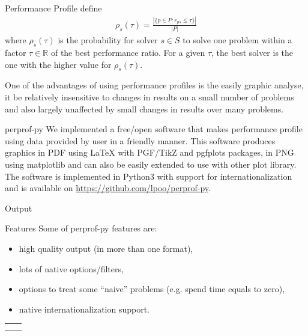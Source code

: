 \documentclass[a0paper,portrait]{baposter}
\begin{document}
\begin{poster}
\begin{posterbox}[column=0,below=auto]{Performance Profile}
    \citeauthor{Dolan2001} define
    \begin{align*}
      \rho_s(\tau) = \frac{| \{p \in P: r_{ps} \leq \tau\} |}{| P |}
    \end{align*}
    where $\rho_s(\tau)$ is the probability for solver $s \in S$ to solve one
    problem within a factor $\tau \in \mathbb{R}$ of the best performance
    ratio. For a given $\tau$, the best solver is the one with the higher
    value for $\rho_s(\tau)$.

    One of the advantages of using performance profiles is the easily graphic
    analyse, it be relatively insensitive to changes in results on a small
    number of problems and also largely unaffected by small changes in
    results over many problems.
  \end{posterbox}

  \begin{posterbox}[column=0,below=auto]{perprof-py}
    We implemented a free/open software that makes performance profile using data
    provided by user in a friendly manner. This software produces graphics in PDF
    using LaTeX with PGF/TikZ and pgfplots packages,
    in PNG using matplotlib and can also be easily extended to
    use with other plot library. The software is implemented in Python3 with
    support for internationalization and is available on
    \url{https://github.com/lpoo/perprof-py}.
  \end{posterbox}

  \begin{posterbox}[column=0,below=auto,height=bottom]{Output}
    
  \end{posterbox}

  \begin{posterbox}[column=1]{Features}
    Some of perprof-py features are:
    \begin{itemize}
      \item high quality output (in more than one format),
      \item lots of native options/filters,
      \item options to treat some ``naive'' problems (e.g. spend time equals to zero),
      \item native internationalization support.
    \end{itemize}

    \begin{center}
      \begin{tabular}{cc}
         &
         \\
         &
        
      \end{tabular}
    \end{center}


\end{posterbox}
\end{poster}
\end{document}
